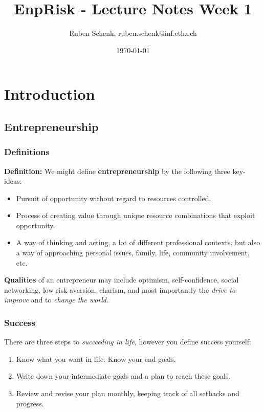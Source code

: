 \documentclass[a4paper]{extarticle}
\title{EnpRisk - Lecture Notes Week 1}
\author{Ruben Schenk, ruben.schenk@inf.ethz.ch}
\date{\today}
\begin{document}
\maketitle
\newpage

\section{Introduction}

\subsection{Entrepreneurship}

\subsubsection{Definitions}

\begin{tbox}
    \textbf{Definition:} We might define \textbf{entrepreneurship} by the following three key-ideas:

    \begin{itemize}
        \item Pursuit of opportunity without regard to resources controlled.
        \item Process of creating value through unique resource combinations that exploit opportunity.
        \item A way of thinking and acting, a lot of different professional contexts, but also a way of approaching personal issues, family, life, community involvement, etc.
    \end{itemize}
\end{tbox}

\textbf{Qualities} of an entrepreneur may include optimism, self-confidence, social networking, low risk aversion, charism, and most importantly the \textit{drive to improve} and to \textit{change the world.}

\subsubsection{Success}

There are three steps to \textit{succeeding in life,} however you define success yourself:

\begin{enumerate}
    \item Know what you want in life. Know your end goals.
    \item Write down your intermediate goals and a plan to reach these goals.
    \item Review and revise your plan monthly, keeping track of all setbacks and progress.
\end{enumerate}
\end{document}
